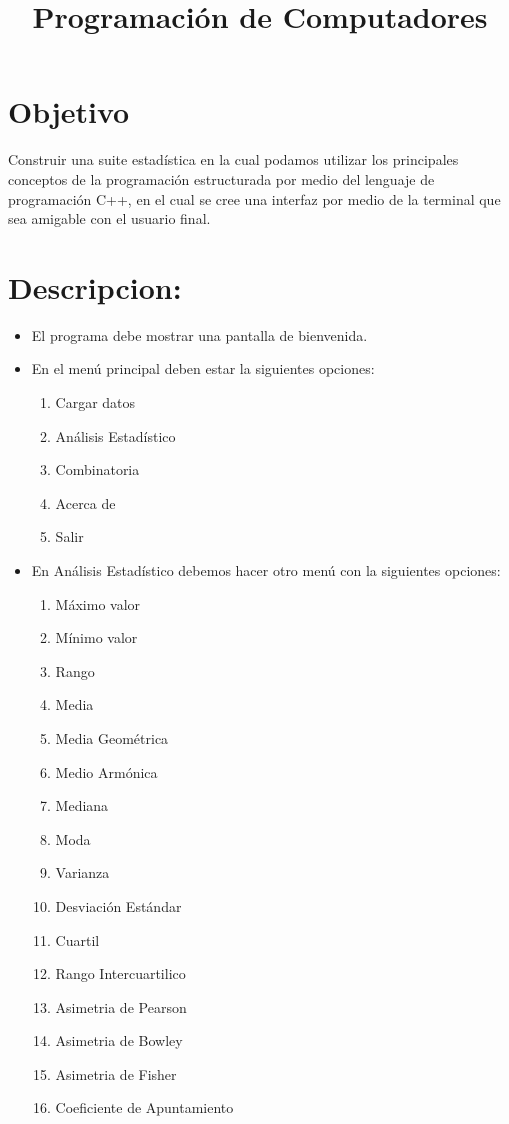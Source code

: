 \documentclass[10pt,a4paper]{article}
\title{Programación de Computadores}
\date{}
\begin{document}
\maketitle
\section{Objetivo}
Construir una suite estadística en la cual podamos utilizar los principales conceptos de la programación estructurada por medio del lenguaje de programación C++, en el cual se cree una interfaz por medio de la terminal que sea amigable con el usuario final.
\section{Descripcion:}


\begin{itemize}
	\item El programa debe mostrar una pantalla de bienvenida.
	\item En el menú principal deben estar la siguientes opciones:
		
	\begin{enumerate}
		\item Cargar datos
		\item Análisis Estadístico
		\item Combinatoria
		\item Acerca de
		\item Salir
	\end{enumerate}

	\item En Análisis Estadístico debemos hacer otro menú con la siguientes opciones:
	\begin{enumerate}
		\item Máximo valor
		\item Mínimo valor
		\item Rango
		\item Media
		\item Media Geométrica
		\item Medio Armónica
		\item Mediana
		\item Moda
		\item Varianza
		\item Desviación Estándar
		\item Cuartil
		\item Rango Intercuartilico
		\item Asimetria de Pearson
		\item Asimetria de Bowley
		\item Asimetria de Fisher
		\item Coeficiente de Apuntamiento		
	\end{enumerate}
	

\end{itemize}
\end{document}
